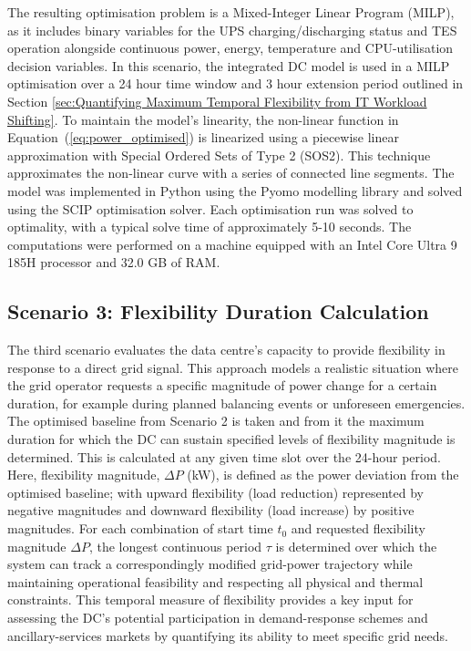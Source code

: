 \documentclass[lettersize,journal]{IEEEtran}
\newcommand{\rev}[1]{\textcolor{blue!70!black}{#1}}
\begin{document}
\rev{The resulting optimisation problem is a Mixed-Integer Linear Program (MILP), as it includes binary variables for the UPS charging/discharging status and TES operation alongside continuous power, energy, temperature and CPU-utilisation decision variables.} In this scenario, the integrated DC model is used in a MILP optimisation over a 24 hour time window and 3 hour extension period outlined in Section \ref{sec:Quantifying Maximum Temporal Flexibility from IT Workload Shifting}. To maintain the model's linearity, the non-linear function in Equation~(\ref{eq:power_optimised}) is linearized using a piecewise linear approximation with Special Ordered Sets of Type 2 (SOS2). This technique approximates the non-linear curve with a series of connected line segments. The model was implemented in Python using the Pyomo modelling library and solved using the SCIP optimisation solver. Each optimisation run was solved to optimality, with a typical solve time of approximately 5-10 seconds. The computations were performed on a machine equipped with an Intel Core Ultra 9 185H processor and 32.0 GB of RAM.



\subsection{Scenario 3: Flexibility Duration Calculation}\label{sec:scenario 3}
The third scenario evaluates the data centre's capacity to provide flexibility in response to a direct grid signal. This approach models a realistic situation where the grid operator requests a specific magnitude of power change for a certain duration, for example during planned balancing events or unforeseen emergencies. The optimised baseline from Scenario 2 is taken and from it the maximum duration for which the DC can sustain specified levels of flexibility magnitude is determined. This is calculated at any given time slot over the 24-hour period. Here, flexibility magnitude, $\Delta P$ (kW), is defined as the power deviation from the optimised baseline; with upward flexibility (load reduction) represented by negative magnitudes and downward flexibility (load increase) by positive magnitudes. For each combination of start time $t_0$ and requested flexibility magnitude $\Delta P$, the longest continuous period $\tau$ is determined over which the system can track a correspondingly modified grid-power trajectory while maintaining operational feasibility and respecting all physical and thermal constraints. This temporal measure of flexibility provides a key input for assessing the DC's potential participation in demand-response schemes and ancillary-services markets by quantifying its ability to meet specific grid needs.
\end{document}
